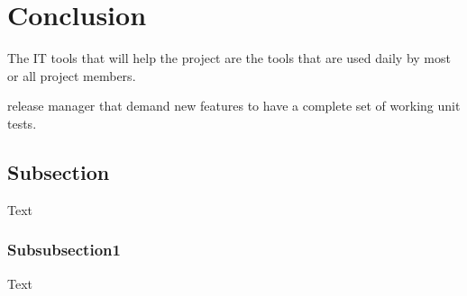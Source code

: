 \section{Conclusion}\label{sec:conclusion}
The IT tools that will help the project are the tools that are used daily by most
or all project members.

release manager that demand new features to have a complete set of working
unit tests.

\subsection{Subsection}
Text
\subsubsection{Subsubsection1}
Text
